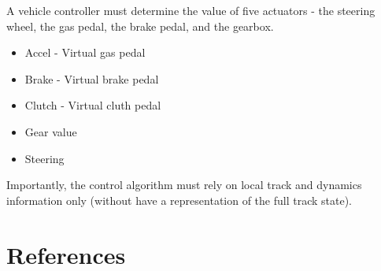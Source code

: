 \documentclass[a4paper]{article}
\begin{document}
A vehicle controller must determine the value of five actuators - the steering wheel, the gas pedal, the brake pedal, and the gearbox. 

\begin{itemize}
\item Accel - Virtual gas pedal
\item Brake - Virtual brake pedal
\item Clutch - Virtual cluth pedal
\item Gear value
\item Steering
\end{itemize}

Importantly, the control algorithm must rely on local track and dynamics information only (without have a representation of the full track state).

\section{References}
\end{document}
